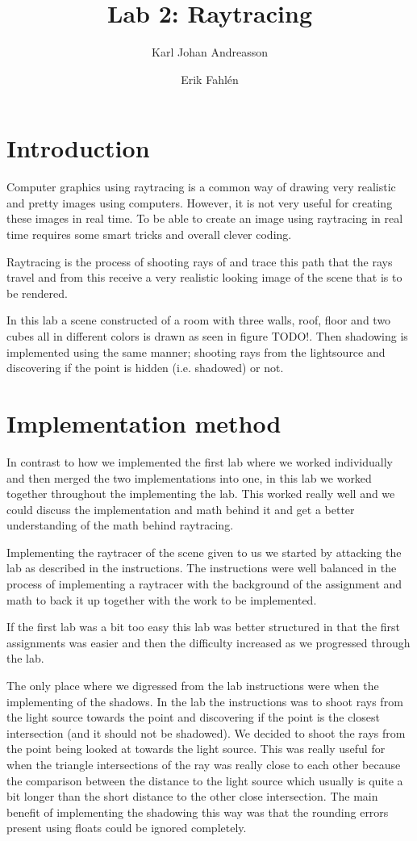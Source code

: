 \documentclass[a4]{article}
\begin{document}
\title{Lab 2: Raytracing}

\author{Karl Johan Andreasson \and Erik Fahlén}

\maketitle

\section{Introduction}
Computer graphics using raytracing is a common way of drawing very realistic and
pretty images using computers. However, it is not very useful for creating these
images in real time. To be able to create an image using raytracing in real time
requires some smart tricks and overall clever coding.

Raytracing is the process of shooting rays of and trace this path that the rays
travel and from this receive a very realistic looking image of the scene that is
to be rendered.

In this lab a scene constructed of a room with three walls, roof, floor and two
cubes all in different colors is drawn as seen in figure TODO!. Then shadowing
is implemented using the same manner; shooting rays from the lightsource and
discovering if the point is hidden (i.e. shadowed) or not.

\section{Implementation method}
In contrast to how we implemented the first lab where we worked individually and
then merged the two implementations into one, in this lab we worked together
throughout the implementing the lab. This worked really well and we could
discuss the implementation and math behind it and get a better understanding of
the math behind raytracing.

Implementing the raytracer of the scene given to us we started by attacking the
lab as described in the instructions. The instructions were well balanced in the
process of implementing a raytracer with the background of the assignment and
math to back it up together with the work to be implemented.

If the first lab was a bit too easy this lab was better structured in that the
first assignments was easier and then the difficulty increased as we progressed
through the lab.

The only place where we digressed from the lab instructions were when the
implementing of the shadows. In the lab the instructions was to shoot rays from
the light source towards the point and discovering if the point is the closest
intersection (and it should not be shadowed). We decided to shoot the rays from
the point being looked at towards the light source. This was really useful for
when the triangle intersections of the ray was really close to each other
because the comparison between the distance to the light source which usually is
quite a bit longer than the short distance to the other close intersection. The
main benefit of implementing the shadowing this way was that the rounding errors
present using floats could be ignored completely.
\end{document}
